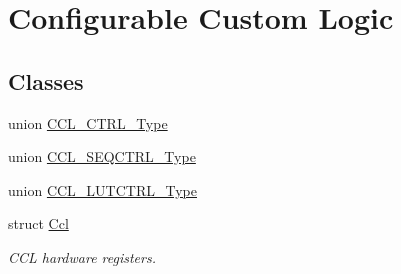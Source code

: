 \hypertarget{group___s_a_m_l21___c_c_l}{}\section{Configurable Custom Logic}
\label{group___s_a_m_l21___c_c_l}
\subsection*{Classes}
\begin{DoxyCompactItemize}
\item 
union \hyperlink{union_c_c_l___c_t_r_l___type}{C\+C\+L\+\_\+\+C\+T\+R\+L\+\_\+\+Type}
\item 
union \hyperlink{union_c_c_l___s_e_q_c_t_r_l___type}{C\+C\+L\+\_\+\+S\+E\+Q\+C\+T\+R\+L\+\_\+\+Type}
\item 
union \hyperlink{union_c_c_l___l_u_t_c_t_r_l___type}{C\+C\+L\+\_\+\+L\+U\+T\+C\+T\+R\+L\+\_\+\+Type}
\item 
struct \hyperlink{struct_ccl}{Ccl}
\begin{DoxyCompactList}\small\item\em C\+C\+L hardware registers. \end{DoxyCompactList}\end{DoxyCompactItemize}
